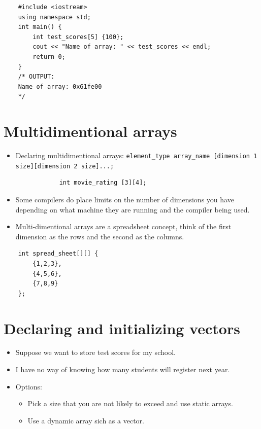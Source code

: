 \begin{verbatim}
    #include <iostream>
    using namespace std;
    int main() {
        int test_scores[5] {100};
        cout << "Name of array: " << test_scores << endl;
        return 0;
    } 
    /* OUTPUT:
    Name of array: 0x61fe00
    */
\end{verbatim}


\section{Multidimentional arrays}
\begin{itemize}
    \item Declaring multidimentional arrays: \verb|element_type array_name [dimension 1 size][dimension 2 size]...;|
        \begin{verbatim}
            int movie_rating [3][4];
        \end{verbatim}
    
    \item Some compilers do place limits on the number of dimensions you have depending on what machine they are running and the compiler being used.
    \item Multi-dimentional arrays are a spreadsheet concept, think of the first dimension as the rows and the second as the columns.
\end{itemize}
\begin{verbatim}
    int spread_sheet[][] {
        {1,2,3},
        {4,5,6},
        {7,8,9}
    };
\end{verbatim}


\section{Declaring and initializing vectors}
\begin{itemize}
    \item Suppose we want to store test scores for my school.
    \item I have no way of knowing how many students will register next year.
    \item Options: 
        \begin{itemize}
            \item Pick a size that you are not likely to exceed and use static arrays.
            \item Use a dynamic array sich as a vector.
        \end{itemize}
\end{itemize}

